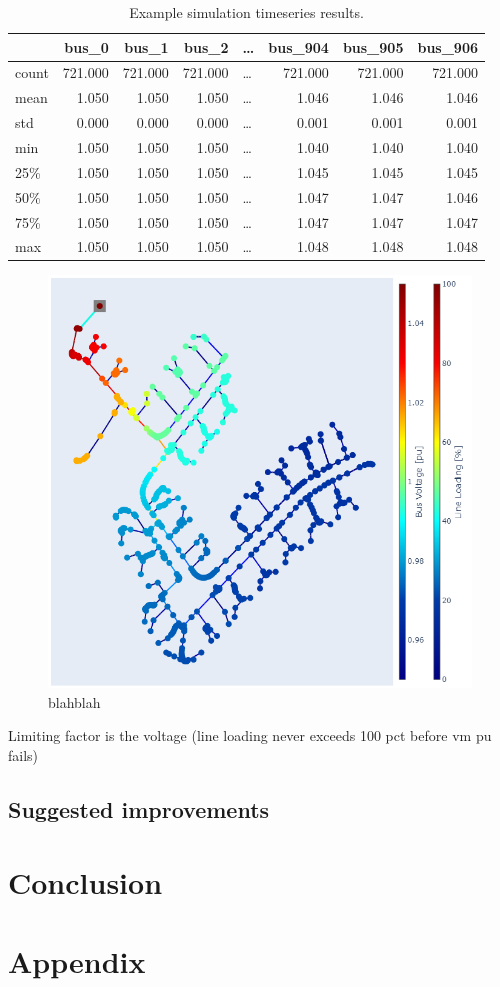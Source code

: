 \documentclass[a4paper,10pt]{report}
\begin{document}
\begin{table}[htpb]
	\centering
	\begin{tabular}{lrrrlrrr}
		\toprule
		& bus\_0 & bus\_1 & bus\_2 & \dots & bus\_904 & bus\_905 & bus\_906 \\
		\midrule
		count & 721.000 & 721.000 & 721.000 & \dots & 721.000 & 721.000 & 721.000 \\
		mean & 1.050 & 1.050 & 1.050 & \dots & 1.046 & 1.046 & 1.046 \\
		std & 0.000 & 0.000 & 0.000 & \dots & 0.001 & 0.001 & 0.001 \\
		min & 1.050 & 1.050 & 1.050 & \dots & 1.040 & 1.040 & 1.040 \\
		25\% & 1.050 & 1.050 & 1.050 & \dots & 1.045 & 1.045 & 1.045 \\
		50\% & 1.050 & 1.050 & 1.050 & \dots & 1.047 & 1.047 & 1.046 \\
		75\% & 1.050 & 1.050 & 1.050 & \dots & 1.047 & 1.047 & 1.047 \\
		max & 1.050 & 1.050 & 1.050 & \dots & 1.048 & 1.048 & 1.048 \\
		\bottomrule
	\end{tabular}
	\caption{Example simulation timeseries results.}
\end{table}

\FloatBarrier
\begin{figure}[htpb]
	\centering
	\includegraphics[width=0.9\linewidth]{EU_LV_host_capacity}
	\caption{blahblah}
	\label{EU_LV_host_capacity}
\end{figure}
\FloatBarrier

Limiting factor is the voltage (line loading never exceeds 100 pct before vm pu fails)


\section{Suggested improvements}


\chapter{Conclusion}


\chapter*{Appendix}
\end{document}
